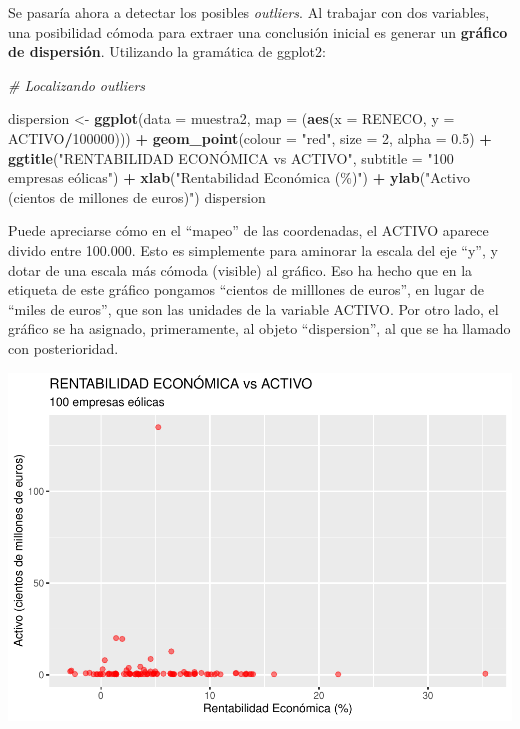 \documentclass[
]{book}
\newenvironment{Shaded}{\begin{snugshade}}{\end{snugshade}}
\newcommand{\AttributeTok}[1]{\textcolor[rgb]{0.13,0.29,0.53}{#1}}
\newcommand{\CommentTok}[1]{\textcolor[rgb]{0.56,0.35,0.01}{\textit{#1}}}
\newcommand{\DecValTok}[1]{\textcolor[rgb]{0.00,0.00,0.81}{#1}}
\newcommand{\FloatTok}[1]{\textcolor[rgb]{0.00,0.00,0.81}{#1}}
\newcommand{\FunctionTok}[1]{\textcolor[rgb]{0.13,0.29,0.53}{\textbf{#1}}}
\newcommand{\NormalTok}[1]{#1}
\newcommand{\OtherTok}[1]{\textcolor[rgb]{0.56,0.35,0.01}{#1}}
\newcommand{\SpecialCharTok}[1]{\textcolor[rgb]{0.81,0.36,0.00}{\textbf{#1}}}
\newcommand{\StringTok}[1]{\textcolor[rgb]{0.31,0.60,0.02}{#1}}
\let\Oldincludegraphics\includegraphics
\renewcommand{\includegraphics}[2][]{%
  \Oldincludegraphics[#1]{#2}%
}
\begin{document}
Se pasaría ahora a detectar los posibles \emph{outliers}. Al trabajar con dos variables, una posibilidad cómoda para extraer una conclusión inicial es generar un \textbf{gráfico de dispersión}. Utilizando la gramática de ggplot2:

\begin{Shaded}
\begin{Highlighting}[]
\CommentTok{\# Localizando outliers}

\NormalTok{dispersion }\OtherTok{\textless{}{-}} \FunctionTok{ggplot}\NormalTok{(}\AttributeTok{data =}\NormalTok{ muestra2, }\AttributeTok{map =}\NormalTok{ (}\FunctionTok{aes}\NormalTok{(}\AttributeTok{x =}\NormalTok{ RENECO,}
                                                 \AttributeTok{y =}\NormalTok{ ACTIVO}\SpecialCharTok{/}\DecValTok{100000}\NormalTok{))) }\SpecialCharTok{+} 
              \FunctionTok{geom\_point}\NormalTok{(}\AttributeTok{colour =} \StringTok{"red"}\NormalTok{, }\AttributeTok{size =} \DecValTok{2}\NormalTok{, }\AttributeTok{alpha =} \FloatTok{0.5}\NormalTok{) }\SpecialCharTok{+}
              \FunctionTok{ggtitle}\NormalTok{(}\StringTok{"RENTABILIDAD ECONÓMICA vs ACTIVO"}\NormalTok{,}
                      \AttributeTok{subtitle =} \StringTok{"100 empresas eólicas"}\NormalTok{) }\SpecialCharTok{+} 
              \FunctionTok{xlab}\NormalTok{(}\StringTok{"Rentabilidad Económica (\%)"}\NormalTok{) }\SpecialCharTok{+} 
              \FunctionTok{ylab}\NormalTok{(}\StringTok{"Activo (cientos de millones de euros)"}\NormalTok{) }
\NormalTok{dispersion}
\end{Highlighting}
\end{Shaded}

Puede apreciarse cómo en el ``mapeo'' de las coordenadas, el ACTIVO aparece divido entre 100.000. Esto es simplemente para aminorar la escala del eje ``y'', y dotar de una escala más cómoda (visible) al gráfico. Eso ha hecho que en la etiqueta de este gráfico pongamos ``cientos de milllones de euros'', en lugar de ``miles de euros'', que son las unidades de la variable ACTIVO. Por otro lado, el gráfico se ha asignado, primeramente, al objeto ``dispersion'', al que se ha llamado con posterioridad.

\includegraphics{_main_files/figure-latex/unnamed-chunk-179-1.pdf}
\end{document}
